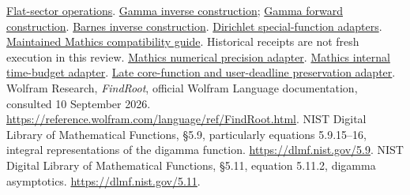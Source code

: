 \documentclass[11pt,letterpaper]{article}
\newcommand{\SHA}{8e859961d7d37f008b826f3a8cad406460271614}
\newcommand{\src}[2]{\href{https://github.com/VladimirReshetnikov/Asymptotic/blob/\SHA/#1}{#2}}
\begin{document}
\begin{thebibliography}{30}
 \src{src/Kernel/FlatSectorOperations.wl}{Flat-sector operations}.
 \src{src/Kernel/GammaInverse.wl}{Gamma inverse construction}; \src{src/Kernel/GammaForward.wl}{Gamma forward construction}.
 \src{src/Kernel/BarnesInverse.wl}{Barnes inverse construction}.
 \src{src/Kernel/DirichletSpecialFunctions.wl}{Dirichlet special-function adapters}.
 \src{docs/Mathics/COMPATIBILITY.md}{Maintained Mathics compatibility guide}. Historical receipts are not fresh execution in this review.
 \src{src/Kernel/MathicsNumerical.wl}{Mathics numerical precision adapter}.
 \src{src/Kernel/MathicsTimeBudget.wl}{Mathics internal time-budget adapter}.
 \src{src/Kernel/MathicsCoreFunctions.wl}{Late core-function and user-deadline preservation adapter}.
 Wolfram Research, \emph{FindRoot}, official Wolfram Language documentation, consulted 10 September 2026. \url{https://reference.wolfram.com/language/ref/FindRoot.html}.
 NIST Digital Library of Mathematical Functions, \S5.9, particularly equations 5.9.15--16, integral representations of the digamma function. \url{https://dlmf.nist.gov/5.9}.
 NIST Digital Library of Mathematical Functions, \S5.11, equation 5.11.2, digamma asymptotics. \url{https://dlmf.nist.gov/5.11}.
\end{thebibliography}
\end{document}
